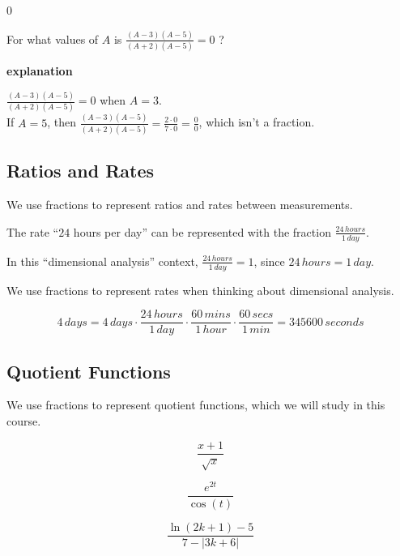 \documentclass{ximera}
\begin{document}
\begin{example} $0$


For what values of $A$ is  $\frac{(A-3)(A-5)}{(A+2)(A-5)} = 0$ ?


\textbf{\textcolor{red!75!green}{explanation}} 

$\frac{(A-3)(A-5)}{(A+2)(A-5)} = 0$ when $A = 3$. \\


If $A = 5$, then $\frac{(A-3)(A-5)}{(A+2)(A-5)} = \frac{2\cdot0}{7\cdot0} = \frac{0}{0}$, which isn't a fraction.






\end{example} 



\subsection*{Ratios and Rates}


We use fractions to represent ratios and rates between measurements. 




The rate  ``$24$ hours per day'' can be represented with the fraction $\frac{24 \, hours}{1 \, day}$. 



In this ``dimensional analysis'' context, $\frac{24 \, hours}{1 \, day} = 1$, since $24 \, hours = 1 \, day$. 


We use fractions to represent rates when thinking about dimensional analysis. 





\[
4 \, days = 4 \, days \cdot \frac{24 \, hours}{1 \, day} \cdot \frac{60 \, mins}{1 \, hour} \cdot \frac{60 \, secs}{1 \, min} = 345600 \, seconds
\]






\subsection*{Quotient Functions}


We use fractions to represent quotient functions, which we will study in this course. 




\[
\frac{x+1}{\sqrt{x}}
\]


\[
\frac{e^{2t}}{\cos(t)}
\]


\[
\frac{\ln(2k+1)-5}{7 - |3k+6|}
\]
\end{document}

